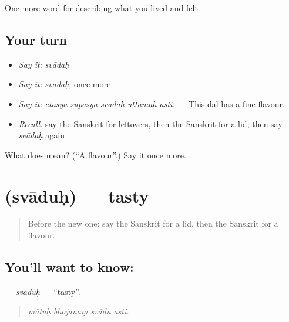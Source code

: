 \begin{grammarlens}[title={What you've built}]
One more word for describing what you lived and felt.
\end{grammarlens}

\subsection*{Your turn}
\begin{itemize}
\raggedright
  \item \emph{Say it:} \emph{svādaḥ}
  \item \emph{Say it:} \emph{svādaḥ}, once more
  \item \emph{Say it:} \emph{etasya sūpasya svādaḥ uttamaḥ asti.} — This dal has a fine flavour.
  \item \emph{Recall:} say the Sanskrit for leftovers, then the Sanskrit for a lid, then say \emph{svādaḥ} again
\end{itemize}

\begin{tcolorbox}[breakable,colback=teal!4,colframe=teal!35!black,title={Before you move on}]
What does  mean? (\textquotedblleft{}A flavour\textquotedblright{}.) Say it once more.
\end{tcolorbox}
\section[\texorpdfstring{\sk{स्वादुः} (svāduḥ)}{स्वादुः (svāduḥ)}]{ (svāduḥ) — tasty}

\label{lesson:SA-C515-svaduh}



\begin{quote}
Before the new one: say the Sanskrit for a lid, then the Sanskrit for a flavour.
\end{quote}

\subsection*{You'll want to know: }
\textbf{} — \emph{svāduḥ} — \textquotedblleft{}tasty\textquotedblright{}.

\begin{quote}
   
\end{quote}

\begin{quote}
\emph{mātuḥ bhojanaṃ svādu asti.}
\end{quote}

